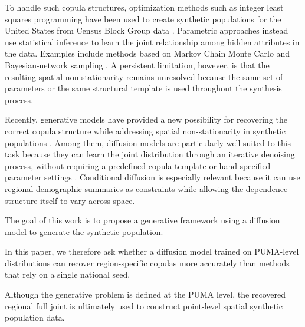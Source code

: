 \documentclass[11pt]{article}
\begin{document}
To handle such copula structures, optimization methods such as integer least squares programming have been used to create synthetic populations for the United States from Census Block Group data \cite{lin2023}. Parametric approaches instead use statistical inference to learn the joint relationship among hidden attributes in the data. Examples include methods based on Markov Chain Monte Carlo \cite{farooq2013} and Bayesian-network sampling \cite{zhou_creating_2022}. A persistent limitation, however, is that the resulting spatial non-stationarity remains unresolved because the same set of parameters or the same structural template is used throughout the synthesis process.

Recently, generative models have provided a new possibility for recovering the correct copula structure while addressing spatial non-stationarity in synthetic populations \cite{sane2025}. Among them, diffusion models are particularly well suited to this task because they can learn the joint distribution through an iterative denoising process, without requiring a predefined copula template or hand-specified parameter settings \cite{ho2020}. Conditional diffusion is especially relevant because it can use regional demographic summaries as constraints while allowing the dependence structure itself to vary across space. 

The goal of this work is to propose a generative framework using a diffusion model to generate the synthetic population. 

In this paper, we therefore ask whether a diffusion model trained on PUMA-level distributions can recover region-specific copulas more accurately than methods that rely on a single national seed.

Although the generative problem is defined at the PUMA level, the recovered regional full joint is ultimately used to construct point-level spatial synthetic population data.





\end{document}
